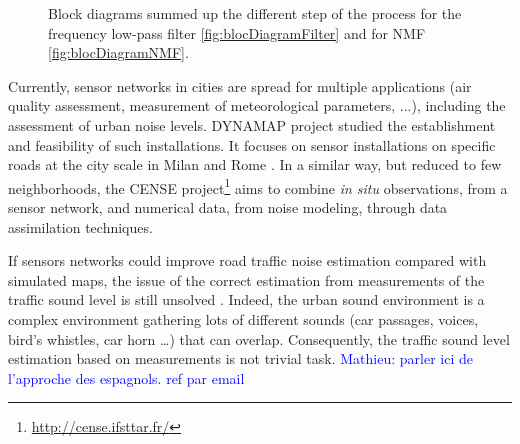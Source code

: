 \documentclass[twocolumn,a4paper,10pt]{article}
\newcommand{\ml}[1]{\textcolor{blue}{ Mathieu: #1}}
\begin{document}
\begin{figure}
    \centering
    \caption{Block diagrams summed up the different step of the process for the frequency low-pass filter \ref{fig:blocDiagramFilter} and for NMF \ref{fig:blocDiagramNMF}.}
    \label{fig:blocDiagram}
\end{figure}

Currently, sensor networks in cities are spread for multiple applications (air quality assessment, measurement of meteorological parameters, ...), including the assessment of urban noise levels. DYNAMAP project \cite{dynamap_2016} studied the establishment and feasibility of such installations. It focuses on sensor installations on specific roads at the city scale in Milan and Rome \cite{bellucci_life_2017}. In a similar way, but reduced to few neighborhoods, the CENSE project\footnote{\url{http://cense.ifsttar.fr/}} \cite{} aims to combine \textit{in situ} observations, from a sensor network, and numerical data, from noise modeling, through data assimilation techniques.

If sensors networks could improve road traffic noise estimation compared with simulated maps, the issue of the correct estimation from  measurements of the traffic sound level is still unsolved \cite{Mioduszewski}. Indeed, the urban sound environment is a complex environment gathering lots of different sounds (car passages, voices, bird's whistles, car horn \dots) that can overlap. Consequently, the traffic sound level estimation based on measurements is not trivial task. \ml{parler ici de l'approche des espagnols. ref par email}
\end{document}
